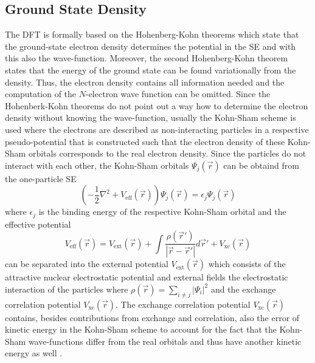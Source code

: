 \subsection{Ground State Density}
\label{ch:dft}
The DFT is formally based on the Hohenberg-Kohn theorems \cite{HohenbergKohn} which state that the ground-state electron density determines the potential in the SE and with this also the wave-function.
Moreover, the second Hohenberg-Kohn theorem states that the energy of the ground state can be found variationally from the density.
Thus, the electron density contains all information needed and the computation of the $N$-electron wave function can be omitted.
Since the Hohenberk-Kohn theorems do not point out a way how to determine the electron density without knowing the wave-function, usually the Kohn-Sham scheme \cite{KohnSham} is used where the electrons are described as non-interacting particles in a respective pseudo-potential that is constructed such that the electron density of these Kohn-Sham orbitals corresponds to the real electron density.
Since the particles do not interact with each other, the Kohn-Sham orbitals $\Psi_j(\vec{r})$ can be obtaind from the one-particle SE
\begin{equation}
\left( -\frac 12  \nabla^2 + V_\text{eff}(\vec{r}) \right) \Psi_j(\vec{r})=\epsilon_j \Psi_j(\vec{r})
\end{equation}
where $\epsilon_j$ is the binding energy of the respective Kohn-Sham orbital and the effective potential 
\begin{equation}
V_\text{eff}(\vec{r})=V_\text{ext}(\vec{r})+ \int \frac{\rho(\vec{r}')}{|\vec{r}-\vec{r}'|} d\vec{r}' + V_\text{xc}(\vec{r})
\end{equation}
can be separated into the external potential $V_\text{ext}(\vec{r})$ which consists of the attractive nuclear electrostatic potential and external fields the electrostatic interaction of the particles where $\rho(\vec{r})=\sum_{i\neq j} |\Psi_i|^2$ and the exchange correlation potential $V_\text{xc}(\vec{r})$.
The exchange correlation potential $V_\text{xc}(\vec{r})$ contains, besides contributions from exchange and correlation, also the error of kinetic energy in the Kohn-Sham scheme to account for the fact that the Kohn-Sham wave-functions differ from the real orbitals and thus have another kinetic energy as well \cite{Holthausen}.

